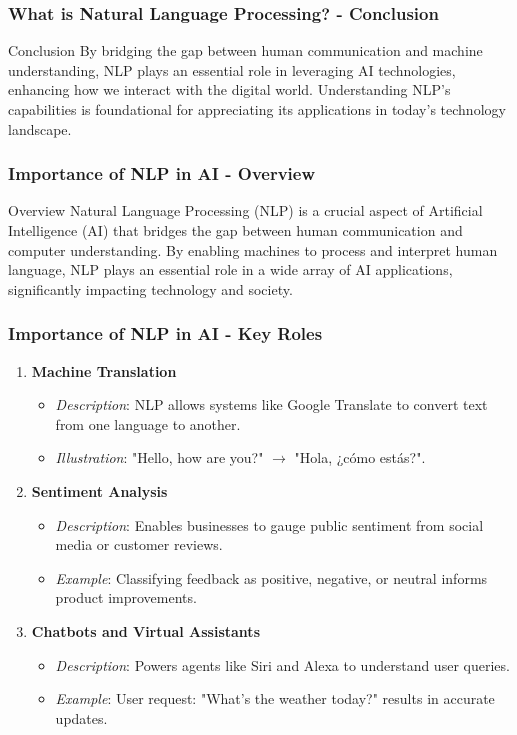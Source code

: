 \documentclass{beamer}
\begin{document}
\begin{frame}[fragile]
    \frametitle{What is Natural Language Processing? - Conclusion}
    \begin{block}{Conclusion}
        By bridging the gap between human communication and machine understanding, NLP plays an essential role in leveraging AI technologies, enhancing how we interact with the digital world. Understanding NLP's capabilities is foundational for appreciating its applications in today's technology landscape.
    \end{block}
\end{frame}

\begin{frame}[fragile]
    \frametitle{Importance of NLP in AI - Overview}
    \begin{block}{Overview}
        Natural Language Processing (NLP) is a crucial aspect of Artificial Intelligence (AI) that bridges the gap between human communication and computer understanding. By enabling machines to process and interpret human language, NLP plays an essential role in a wide array of AI applications, significantly impacting technology and society.
    \end{block}
\end{frame}

\begin{frame}[fragile]
    \frametitle{Importance of NLP in AI - Key Roles}
    \begin{enumerate}
        \item \textbf{Machine Translation}
        \begin{itemize}
            \item \textit{Description}: NLP allows systems like Google Translate to convert text from one language to another.
            \item \textit{Illustration}: "Hello, how are you?" $\rightarrow$ "Hola, ¿cómo estás?".
        \end{itemize}
        
        \item \textbf{Sentiment Analysis}
        \begin{itemize}
            \item \textit{Description}: Enables businesses to gauge public sentiment from social media or customer reviews. 
            \item \textit{Example}: Classifying feedback as positive, negative, or neutral informs product improvements.
        \end{itemize}
        
        \item \textbf{Chatbots and Virtual Assistants}
        \begin{itemize}
            \item \textit{Description}: Powers agents like Siri and Alexa to understand user queries.
            \item \textit{Example}: User request: "What's the weather today?" results in accurate updates.
        \end{itemize}
    \end{enumerate}
\end{frame}
\end{document}
